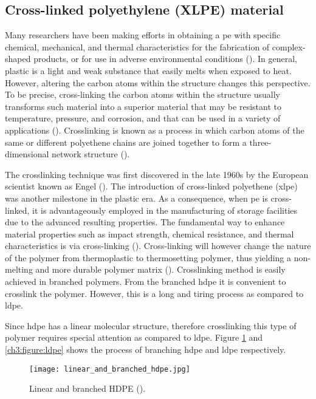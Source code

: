 \subsection{Cross-linked polyethylene (XLPE) material}
Many researchers have been making efforts in obtaining a \acrshort{pe} with specific chemical, mechanical, and thermal characteristics for the fabrication of complex-shaped products, or for use in adverse environmental conditions (\cite{kurtz2009cross}). In general, plastic is a light and weak substance that easily melts when exposed to heat. However, altering the carbon atoms within the structure changes this perspective. To be precise, cross-linking the carbon atoms within the structure usually transforms such material into a superior material that may be resistant to temperature, pressure, and corrosion, and that can be used in a variety of applications (\cite{peacock2000handbook}). Crosslinking is known as a process in which carbon atoms of the same or different polyethene chains are joined together to form a three-dimensional network structure (\cite{kurtz2009cross}).

The crosslinking technique was first discovered in the late 1960s by the European scientist known as Engel (\cite{peacock2000handbook}). The introduction of cross-linked polyethene (\acrshort{xlpe}) was another milestone in the plastic era. As a consequence, when \acrshort{pe} is cross-linked, it is advantageously employed in the manufacturing of storage facilities due to the advanced resulting properties. The fundamental way to enhance material properties such as impact strength, chemical resistance, and thermal characteristics is via cross-linking (\cite{andreopoulos1986mechanical}). Cross-linking will however change the nature of the polymer from thermoplastic to thermosetting polymer, thus yielding a non-melting and more durable polymer matrix (\cite{clemens2017microstructure}). Crosslinking method is easily achieved in branched polymers. From the branched \acrshort{hdpe} it is convenient to crosslink the polymer. However, this is a long and tiring process as compared to \acrshort{ldpe}.

Since \acrshort{hdpe} has a linear molecular structure, therefore crosslinking this type of polymer requires special attention as compared to \acrshort{ldpe}. Figure \ref{ch3:figure:hdpe} and \ref{ch3:figure:ldpe} shows the process of branching \acrshort{hdpe} and \acrshort{ldpe} respectively.
 
\begin{figure}[H]
    \centering
    \texttt{[image: linear\_and\_branched\_hdpe.jpg]}
    \caption{Linear and branched HDPE (\cite{gabriel1998history}).}
    \label{ch3:figure:hdpe}
\end{figure}

